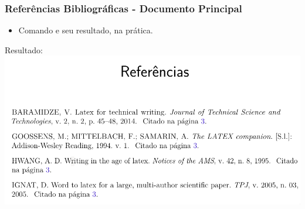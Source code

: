 \documentclass{beamer}
\begin{document}
\begin{frame}[fragile]

  \frametitle{Referências Bibliográficas - Documento Principal}

  \begin{itemize}
  \item Comando \verb__ e seu resultado, na prática.
  \end{itemize}


\begin{center}
  Resultado: \\
  \includegraphics[scale=0.30]{../Imagens/A2I121.png}
\end{center}

\end{frame}





\end{document}
